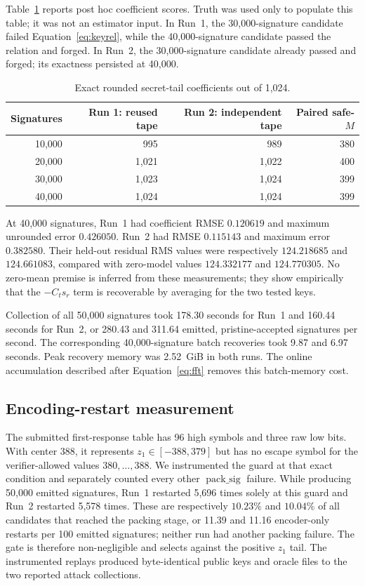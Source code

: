 \documentclass[11pt,a4paper]{article}
\begin{document}
Table~\ref{tab:recovery} reports post hoc coefficient scores.  Truth was used
only to populate this table; it was not an estimator input.  In Run~1, the
30,000-signature candidate failed Equation~\eqref{eq:keyrel}, while the
40,000-signature candidate passed the relation and forged.  In Run~2, the
30,000-signature candidate already passed and forged; its exactness persisted
at 40,000.

\begin{table}[t]
\centering
\caption{Exact rounded secret-tail coefficients out of 1,024.}
\label{tab:recovery}
\begin{tabular}{@{}rrrr@{}}
\toprule
Signatures & Run 1: reused tape & Run 2: independent tape & Paired safe-$M$\\
\midrule
10,000 & 995   & 989   & 380\\
20,000 & 1,021 & 1,022 & 400\\
30,000 & 1,023 & 1,024 & 399\\
40,000 & 1,024 & 1,024 & 399\\
\bottomrule
\end{tabular}
\end{table}

At 40,000 signatures, Run~1 had coefficient RMSE $0.120619$ and maximum
unrounded error $0.426050$.  Run~2 had RMSE $0.115143$ and maximum error
$0.382580$.  Their held-out residual RMS values were respectively
$124.218685$ and $124.661083$, compared with zero-model values $124.332177$
and $124.770305$.  No zero-mean premise is inferred from these measurements;
they show empirically that the $-C_ts_r$ term is recoverable by averaging for
the two tested keys.

Collection of all 50,000 signatures took 178.30 seconds for Run~1 and 160.44
seconds for Run~2, or 280.43 and 311.64 emitted, pristine-accepted signatures
per second.  The corresponding 40,000-signature batch recoveries took 9.87
and 6.97 seconds.  Peak recovery memory was 2.52~GiB in both runs.  The online
accumulation described after Equation~\eqref{eq:fft} removes this batch-memory
cost.

\subsection{Encoding-restart measurement}

The submitted first-response table has 96 high symbols and three raw low
bits.  With center $388$, it represents $z_1\in[-388,379]$ but has no escape
symbol for the verifier-allowed values $380,\ldots,388$.  We instrumented the
guard at that exact condition and separately counted every other
$\operatorname{pack\_sig}$ failure.  While producing 50,000 emitted signatures,
Run~1 restarted 5,696 times solely at this guard and Run~2 restarted 5,578
times.  These are respectively $10.23\%$ and $10.04\%$ of all candidates that
reached the packing stage, or 11.39 and 11.16 encoder-only restarts per 100
emitted signatures; neither run had another packing failure.  The gate is
therefore non-negligible and selects against the positive $z_1$ tail.  The
instrumented replays produced byte-identical public keys and oracle files to
the two reported attack collections.
\end{document}
